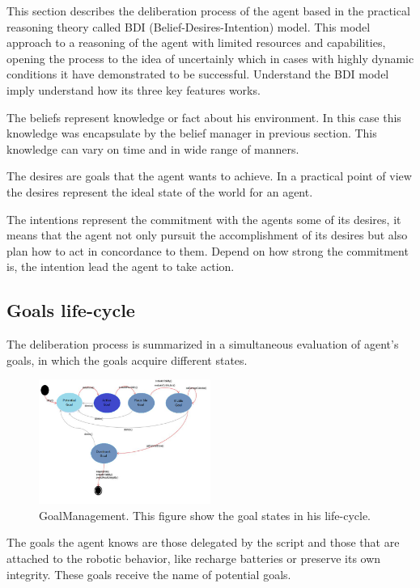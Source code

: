 This section describes the deliberation process of the agent based in the practical reasoning theory called BDI (Belief-Desires-Intention) model. This model approach to a reasoning of the agent with limited resources and capabilities, opening the process to the idea of uncertainly which in cases with highly dynamic conditions it have demonstrated to be successful. Understand the BDI model imply understand how its three key features works.

The beliefs represent knowledge or fact about his environment. In this case this knowledge was encapsulate by the belief manager in previous section. This knowledge can vary on time and in wide range of manners.

The desires are goals that the agent wants to achieve. In a practical point of view the desires represent the ideal state of the world for an agent.

The intentions represent the commitment with the agents some of its desires, it means that the agent not only pursuit the accomplishment of its desires but also plan how to act in concordance to them. Depend on how strong the commitment is, the intention lead the agent to take action.

\subsection{Goals life-cycle}

The deliberation process is summarized in a simultaneous evaluation of agent's goals, in which the goals acquire different states.

\begin{figure}
	\centering
	\includegraphics[width=0.5\textwidth]{Images/GoalManagement.png} 
	\caption{GoalManagement. This figure show the goal states in his life-cycle.}
	\label{fig:GoalManager}
\end{figure}

The goals the agent knows are those  delegated by the script and those that are attached to the robotic behavior, like recharge batteries or preserve its own integrity. These goals receive the name of potential goals. 

